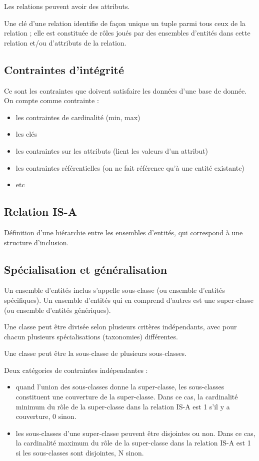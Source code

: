 		Les relations peuvent avoir des attributs.
		
		Une clé d'une relation identifie de façon unique un tuple parmi tous ceux de la relation ; elle est constituée de rôles joués par des ensembles d'entités dans cette relation et/ou d'attributs de la relation.
		
		\subsection{Contraintes d'intégrité}
		
		Ce sont les contraintes que doivent satisfaire les données d'une base de donnée. On compte comme contrainte :
		
		\begin{itemize}
			\item les contraintes de cardinalité (min, max)
			\item les clés
			\item les contraintes sur les attributs (lient les valeurs d'un attribut)
			\item les contraintes référentielles (on ne fait référence qu'à une entité existante)
			\item etc
		\end{itemize}
		
		\subsection{Relation IS-A}
		
		Définition d'une hiérarchie entre les ensembles d'entités, qui correspond à une structure d'inclusion.
		
		\subsection{Spécialisation et généralisation}
		
		Un ensemble d'entités inclus s'appelle sous-classe (ou ensemble d'entités spécifiques). Un ensemble d'entités qui en comprend d'autres est une super-classe (ou ensemble d'entités génériques).
		
		Une classe peut être divisée selon plusieurs critères indépendants, avec pour chacun plusieurs spécialisations (taxonomies) différentes.
		
		Une classe peut être la sous-classe de plusieurs sous-classes.
		
		Deux catégories de contraintes indépendantes :
		
		\begin{itemize}
			\item quand l'union des sous-classes donne la super-classe, les sous-classes constituent une couverture de la super-classe. Dans ce cas, la cardinalité minimum du rôle de la super-classe dans la relation IS-A est 1 s'il y a couverture, 0 sinon.
			
			\item les sous-classes d'une super-classe peuvent être disjointes ou non. Dans ce cas, la cardinalité maximum du rôle de la super-classe dans la relation IS-A est 1 si les sous-classes sont disjointes, N sinon.
		\end{itemize}
		
